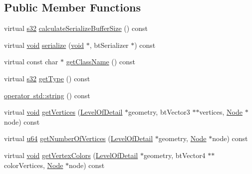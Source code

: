 \subsection*{Public Member Functions}
\begin{DoxyCompactItemize}
\item 
virtual \mbox{\hyperlink{_util_8h_aa62c75d314a0d1f37f79c4b73b2292e2}{s32}} \mbox{\hyperlink{classnjli_1_1_sprite2_d_a4151be6ec53acfacc209ec1a0755a671}{calculate\+Serialize\+Buffer\+Size}} () const
\item 
virtual \mbox{\hyperlink{_thread_8h_af1e856da2e658414cb2456cb6f7ebc66}{void}} \mbox{\hyperlink{classnjli_1_1_sprite2_d_ae372ea409ac67b1585e7928bffe5f502}{serialize}} (\mbox{\hyperlink{_thread_8h_af1e856da2e658414cb2456cb6f7ebc66}{void}} $\ast$, bt\+Serializer $\ast$) const
\item 
virtual const char $\ast$ \mbox{\hyperlink{classnjli_1_1_sprite2_d_a6e82261effc23589cca219ddb5c90851}{get\+Class\+Name}} () const
\item 
virtual \mbox{\hyperlink{_util_8h_aa62c75d314a0d1f37f79c4b73b2292e2}{s32}} \mbox{\hyperlink{classnjli_1_1_sprite2_d_a57e7a9f75af0208001c075120f1ece3c}{get\+Type}} () const
\item 
\mbox{\hyperlink{classnjli_1_1_sprite2_d_a565b51d4b11b9d35f6ca7e54fbf7fb8e}{operator std\+::string}} () const
\item 
virtual \mbox{\hyperlink{_thread_8h_af1e856da2e658414cb2456cb6f7ebc66}{void}} \mbox{\hyperlink{classnjli_1_1_sprite2_d_a5f7f2c09006d809bce2914d86e3350d6}{get\+Vertices}} (\mbox{\hyperlink{classnjli_1_1_level_of_detail}{Level\+Of\+Detail}} $\ast$geometry, bt\+Vector3 $\ast$$\ast$vertices, \mbox{\hyperlink{classnjli_1_1_node}{Node}} $\ast$node) const
\item 
virtual \mbox{\hyperlink{_util_8h_ad758b7a5c3f18ed79d2fcd23d9f16357}{u64}} \mbox{\hyperlink{classnjli_1_1_sprite2_d_a96d489e0131032c64a150cd1629fd0e5}{get\+Number\+Of\+Vertices}} (\mbox{\hyperlink{classnjli_1_1_level_of_detail}{Level\+Of\+Detail}} $\ast$geometry, \mbox{\hyperlink{classnjli_1_1_node}{Node}} $\ast$node) const
\item 
virtual \mbox{\hyperlink{_thread_8h_af1e856da2e658414cb2456cb6f7ebc66}{void}} \mbox{\hyperlink{classnjli_1_1_sprite2_d_ac17cc53c2a39003e8459e990102a23fb}{get\+Vertex\+Colors}} (\mbox{\hyperlink{classnjli_1_1_level_of_detail}{Level\+Of\+Detail}} $\ast$geometry, bt\+Vector4 $\ast$$\ast$color\+Vertices, \mbox{\hyperlink{classnjli_1_1_node}{Node}} $\ast$node) const
\item 

\end{DoxyCompactItemize}
